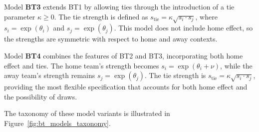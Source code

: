 Model \textbf{BT3} extends BT1 by allowing ties through the introduction of a tie parameter $\kappa \geq 0$.
The tie strength is defined as $s_{\text{tie}} = \kappa \sqrt{s_i \cdot s_j}$, where $s_i = \exp(\theta_i)$ and $s_j = \exp(\theta_j)$.
This model does not include home effect, so the strengths are symmetric with respect to home and away contexts.

Model \textbf{BT4} combines the features of BT2 and BT3, incorporating both home effect and ties.
The home team's strength becomes $s_i = \exp(\theta_i + \nu)$, while the away team's strength remains $s_j = \exp(\theta_j)$.
The tie strength is $s_{\text{tie}} = \kappa \sqrt{s_i \cdot s_j}$, providing the most flexible specification that accounts for both home effect and the possibility of draws.

The taxonomy of these model variants is illustrated in Figure~\ref{fig:bt_models_taxonomy}.

